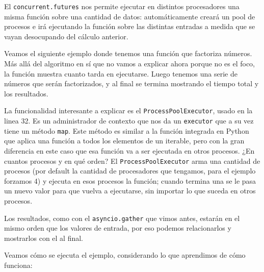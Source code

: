 El \texttt{concurrent.futures} nos permite ejecutar en distintos procesadores una misma función sobre una cantidad de datos: automáticamente creará un pool de procesos e irá ejecutando la función sobre las distintas entradas a medida que se vayan desocupando del cálculo anterior.

Veamos el siguiente ejemplo donde tenemos una función que factoriza números. Más allá del algoritmo en sí que no vamos a explicar ahora porque no es el foco, la función muestra cuanto tarda en ejecutarse. Luego tenemos una serie de números que serán factorizados, y al final se termina mostrando el tiempo total y los resultados.


La funcionalidad interesante a explicar es el \texttt{ProcessPoolExecutor}, usado en la linea 32. Es un administrador de contexto que nos da un \texttt{executor} que a su vez tiene un método \texttt{map}. Este método es similar a la función  integrada en Python que aplica una función a todos los elementos de un iterable, pero con la gran diferencia en este caso que esa función va a ser ejecutada en otros procesos. ¿En cuantos procesos y en qué orden? El \texttt{ProcessPoolExecutor} arma una cantidad de procesos (por default la cantidad de procesadores que tengamos, para el ejemplo forzamos 4) y ejecuta en esos procesos la función; cuando termina una se le pasa un nuevo valor para que vuelva a ejecutarse, sin importar lo que suceda en otros procesos. 

Los resultados, como con el \texttt{asyncio.gather} que vimos antes, estarán en el mismo orden que los valores de entrada, por eso podemos relacionarlos y mostrarlos con el  al final.

Veamos cómo se ejecuta el ejemplo, considerando lo que aprendimos de cómo funciona:



